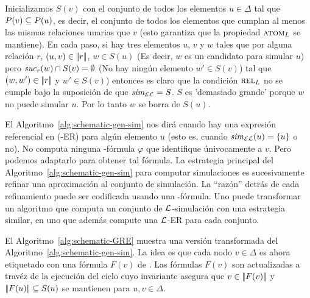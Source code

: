 %


Inicializamos $S(v)$ con
el conjunto de todos los elementos $u\in\Delta$ tal que $P(v)\subseteq
P(u)$, es decir, el conjunto de todos los elementos que cumplan al menos las
mismas relaciones unarias que $v$ (esto garantiza que la propiedad $\textsc{atom}_L$ se mantiene).
En cada paso, si hay tres elementos $u$, $v$ y $w$ tales que
por alguna relaci\'on $r$, $(u,v) \in |\!|r|\!|$, $w\in S(u)$
(Es decir, $w$ es un candidato para simular $u$) pero ${\it suc}_{r}(w)\cap S(v) = \emptyset$
(No hay ning\'un elemento $w'\in S(v)$) tal que $(w, w') \in |\!|r|\!|$
y $w'\in S(v)$) entonces es claro que la condici\'on $\textsc{rel}_L$ no se cumple
bajo la suposici\'on de que ${\it sim}_\mathcal{EL}=S$. $S$ es 'demasiado grande' porque
$w$ no puede simular $u$. Por lo tanto $w$ se borra de $S(u)$.


El Algoritmo~\ref{alg:schematic-gen-sim} nos dir\'a cuando hay una expresi\'on referencial en \EL (\EL-ER) para alg\'un elemento $u$ (esto es, cuando
${\it sim}_{\mathcal{EL}}(u) = \{u\}$ o no). No computa ninguna \EL-f\'ormula $\varphi$ que identifique \'univocamente a $v$. Pero
podemos adaptarlo para obtener tal f\'ormula.
La estrategia principal del Algoritmo~\ref{alg:schematic-gen-sim} para computar simulaciones es sucesivamente refinar una aproximaci\'on al conjunto de simulaci\'on.
La ``raz\'on'' detr\'as de cada refinamiento puede ser codificada usando una \EL-f\'ormula.
Uno puede transformar un algoritmo que computa un conjunto de $\mathcal{L}$-simulaci\'on con una estrategia similar, en uno que adem\'as compute una $\mathcal{L}$-ER para cada conjunto.


El Algoritmo~\ref{alg:schematic-GRE} muestra una versi\'on transformada del 
Algoritmo~\ref{alg:schematic-gen-sim}. La idea es que cada nodo
$v\in\Delta$ es ahora etiquetado con una f\'ormula
$F(v)$ de \EL. Las f\'ormulas $F(v)$ son actualizadas a trav\'ez de la ejecuci\'on del ciclo cuyo invariante asegura que $v \in
|\!|F(v)|\!|$ y $|\!|F(u)|\!| \subseteq S(u)$ se mantienen para
$u,v\in\Delta$.

